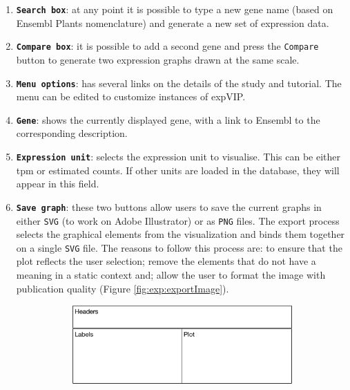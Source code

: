 \begin{enumerate}
\item
  \textbf{\lstinline!Search box!}: at any point it is possible to type a new gene name (based on Ensembl Plants nomenclature) and generate a new set of expression data.
\item
  \textbf{\lstinline!Compare box!}: it is possible to add a second gene and press the \lstinline!Compare! button to generate two expression graphs drawn at the same scale.
\item
  \textbf{\lstinline!Menu options!}: has several links on the details of the study and tutorial. The menu can be edited to customize instances of expVIP. 
\item
  \textbf{\lstinline!Gene!}: shows the currently displayed gene, with a link to Ensembl to the corresponding description. 
\item
  \textbf{\lstinline!Expression unit!}: selects the expression unit to visualise. This can be either \gls{tpm} or  estimated counts. If other units are loaded in the database, they will appear in this field. 
\item
  \textbf{\lstinline!Save graph!}: these two buttons allow users to save the current graphs in either \lstinline!SVG! (to work on Adobe Illustrator) or as \lstinline!PNG! files. 
  The export process selects the graphical elements from the visualization and binds them together on a single \verb|SVG| file. The reasons to follow this process are: to ensure that the plot reflects the user selection; remove the elements that do not have a meaning in a static context and; allow the user to format the image with publication quality (Figure \ref{fig:exp:exportImage}).

\begin{figure}

\begin{subfigure}{1\textwidth}
\caption{}
\label{fig:exp:exportLayout}
\includegraphics[width=1\textwidth]{expVIP/Figures/Exportsketch.pdf}
\end{subfigure}


\end{figure}
\end{enumerate}

